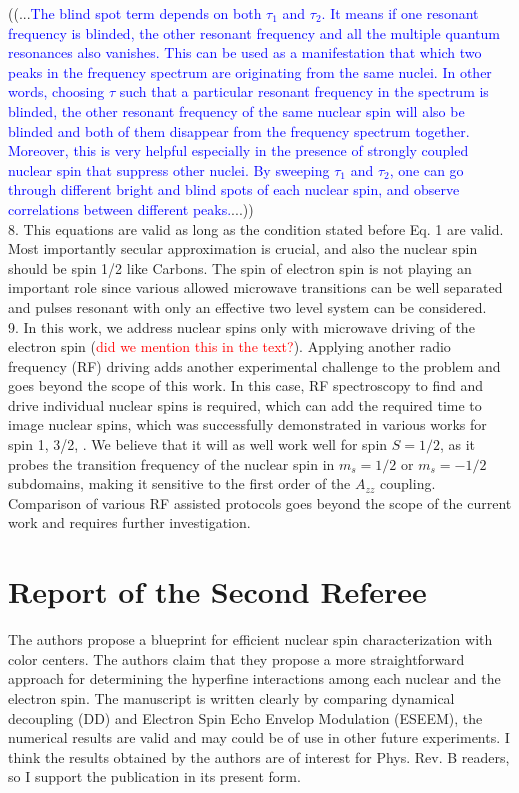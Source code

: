 \documentclass[12pt]{amsart}
\begin{document}
	((...\textcolor{blue}{The blind spot term depends on both $\tau_1$ and $\tau_2$. It means if one resonant frequency is blinded, the other resonant frequency and all the multiple quantum resonances also vanishes. This can be used as a manifestation that which two peaks in the frequency spectrum are originating from the same nuclei. In other words, choosing $\tau$ such that a particular resonant frequency in the spectrum is blinded, the other resonant frequency of the same nuclear spin will also be blinded and both of them disappear from the frequency spectrum together. Moreover, this is very helpful especially in the presence of strongly coupled nuclear spin that suppress other nuclei. By sweeping $\tau_1$ and $\tau_2$, one can go through different bright and blind spots of each nuclear spin, and observe correlations between different peaks.}...))\\
	
	8. This equations are valid as long as the condition stated before Eq. 1 are valid. Most importantly secular approximation is crucial, and also the nuclear spin should be spin 1/2 like Carbons. The spin of electron spin is not playing an important role since various allowed microwave transitions can be well separated and pulses resonant with only an effective two level system can be considered.\\
	
	9. In this work, we address nuclear spins only with microwave driving of the electron spin (\textcolor{red}{did we mention this in the text?}). Applying another radio frequency (RF) driving adds another experimental challenge to the problem and goes beyond the scope of this work. In this case, RF spectroscopy to find and drive individual nuclear spins is required, which can add the required time to image nuclear spins, which was successfully demonstrated in various works for spin 1, 3/2,  \cite{DDRF, ENDOR, SSRV2}. We believe that it will as well work well for spin $S=1/2$, as it probes the transition frequency of the nuclear spin in $m_s=1/2$ or $m_s=-1/2$ subdomains, making it sensitive to the first order of the $A_{zz}$ coupling. Comparison of various RF assisted protocols goes beyond the scope of the current work and requires further investigation.\\

	\color{red} \section{Report of the Second Referee}
	The authors propose a blueprint for efficient nuclear spin
	characterization with color centers. The authors claim that they
	propose a more straightforward approach for determining the hyperfine
	interactions among each nuclear and the electron spin. The manuscript
	is written clearly by comparing dynamical decoupling (DD) and Electron
	Spin Echo Envelop Modulation (ESEEM), the numerical results are valid
	and may could be of use in other future experiments. I think the
	results obtained by the authors are of interest for Phys. Rev. B
	readers, so I support the publication in its present form.
	
\end{document}
